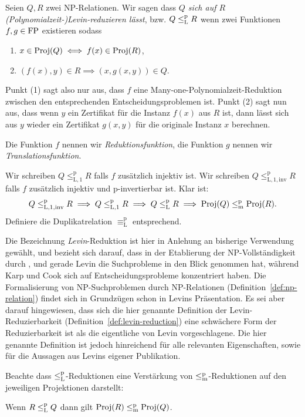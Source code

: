 \begin{definition}\label{def:levin-reduction}
    Seien $Q, R$ zwei NP-Relationen. Wir sagen dass \emph{$Q$ sich auf $R$ (Polynomialzeit-)Levin-reduzieren lässt}, bzw. $Q\leq_\mathrm{L}^\mathrm{p} R$ wenn zwei Funktionen $f, g\in \mathrm{FP}$ existieren sodass
    \begin{enumerate}
        \item $x\in\operatorname{Proj}(Q) \iff f(x)\in\operatorname{Proj}(R)$,
        \item $(f(x), y)\in R \implies (x, g(x,y))\in Q$.
    \end{enumerate}
    Punkt (1) sagt also nur aus, dass $f$ eine Many-one-Polynomialzeit-Reduktion zwischen den entsprechenden Entscheidungsproblemen ist.
    Punkt (2) sagt nun aus, dass wenn $y$ ein Zertifikat für die Instanz $f(x)$ aus $R$ ist, dann lässt sich aus $y$ wieder ein Zertifikat $g(x,y)$ für die originale Instanz $x$ berechnen.

    Die Funktion $f$ nennen wir \emph{Reduktionsfunktion}, die Funktion $g$ nennen wir \emph{Translationsfunktion}.

    Wir schreiben $Q\leq_\mathrm{L,1}^\mathrm p R$ falls $f$ zusätzlich injektiv ist. Wir schreiben $Q\leq_\mathrm{L,1,inv}^\mathrm p R$ falls $f$ zusätzlich injektiv und p-invertierbar ist. Klar ist:
    \[ Q\leq_\mathrm{L,1,inv}^\mathrm p R \implies Q \leq_\mathrm{L,1}^\mathrm p R \implies Q \leq_\mathrm{L}^\mathrm{p} R \implies \operatorname{Proj}(Q) \leq_\mathrm{m}^\mathrm{p} \operatorname{Proj}(R).\]
    Definiere die Duplikatrelation $\equiv_\mathrm L^\mathrm p$ entsprechend.
\end{definition}
Die Bezeichnung \emph{Levin}-Reduktion ist hier in Anlehung an bisherige Verwendung gewählt, und bezieht sich darauf, dass in der Etablierung der NP-Vollständigkeit durch \textcite{karp_reducibility_1972}, \textcite{cook_complexity_1971} und \textcite{levin_universal_1973} gerade Levin die Suchprobleme in den Blick genommen hat, während Karp und Cook sich auf Entscheidungsprobleme konzentriert haben. Die Formalisierung von NP-Suchproblemen durch NP-Relationen (Definition~\ref{def:np-relation}) findet sich in Grundzügen schon in Levins Präsentation. Es sei aber darauf hingewiesen, dass sich die hier genannte Definition der Levin-Reduzierbarkeit (Definition~\ref{def:levin-reduction}) eine schwächere Form der Reduzierbarkeit ist als die eigentliche von Levin vorgeschlagene. Die hier genannte Definition ist jedoch hinreichend für alle relevanten Eigenschaften, sowie für die Aussagen aus Levins eigener Publikation.

Beachte dass $\leq_\mathrm{L}^\mathrm{p}$-Reduktionen eine Verstärkung von $\leq_\mathrm{m}^\mathrm{p}$-Reduktionen auf den jeweiligen Projektionen darstellt:
\begin{observation}
    Wenn $R\leq_\mathrm{L}^\mathrm{p} Q$ dann gilt $\operatorname{Proj}(R)\leq_\mathrm{m}^\mathrm{p} \operatorname{Proj}(Q)$.
\end{observation}


